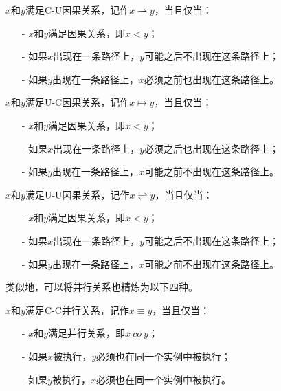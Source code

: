 \begin{definition}\label{def:c_u_causal}
$x$和$y$满足C-U因果关系，记作$x\rightharpoonup y$，当且仅当：
  \begin{itemize}
    \item[-] $x$和$y$满足因果关系，即$x<y$；
    \item[-] 如果$x$出现在一条路径上，$y$可能之后不出现在这条路径上；
    \item[-] 如果$y$出现在一条路径上，$x$必须之前也出现在这条路径上。
  \end{itemize}
\end{definition}

\begin{definition}\label{def:u_c_causal}
$x$和$y$满足U-C因果关系，记作$x\mapsto y$，当且仅当：
  \begin{itemize}
    \item[-] $x$和$y$满足因果关系，即$x<y$；
    \item[-] 如果$x$出现在一条路径上，$y$必须之后也出现在这条路径上；
    \item[-] 如果$y$出现在一条路径上，$x$可能之前不出现在这条路径上。
  \end{itemize}
\end{definition}

\begin{definition}\label{def:u_u_causal}
$x$和$y$满足U-U因果关系，记作$x\rightleftharpoons y$，当且仅当：
  \begin{itemize}
    \item[-] $x$和$y$满足因果关系，即$x<y$；
    \item[-] 如果$x$出现在一条路径上，$y$可能之后不出现在这条路径上；
    \item[-] 如果$y$出现在一条路径上，$x$可能之前不出现在这条路径上。
  \end{itemize}
\end{definition}

类似地，可以将并行关系也精炼为以下四种。

\begin{definition}\label{def:c_c_concurrency}
$x$和$y$满足C-C并行关系，记作$x\equiv y$，当且仅当：
  \begin{itemize}
    \item[-] $x$和$y$满足并行关系，即$x~co~y$；
    \item[-] 如果$x$被执行，$y$必须也在同一个实例中被执行；
    \item[-] 如果$y$被执行，$x$必须也在同一个实例中被执行。
  \end{itemize}
\end{definition}

